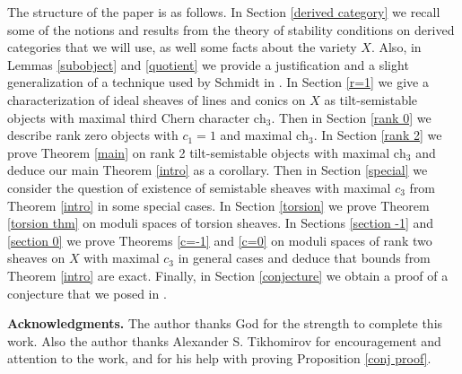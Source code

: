 \documentclass{amsart}
\begin{document}
	The structure of the paper is as follows. In Section \ref{derived category} we recall some of the notions and results from the theory of stability conditions on derived categories that we will use, as well some facts about the variety $X$. Also, in Lemmas \ref{subobject} and \ref{quotient} we provide a justification and a slight generalization of a technique used by Schmidt in \cite{Sch23}. In Section \ref{r=1} we give a characterization of ideal sheaves of lines and conics on $X$ as tilt-semistable objects with maximal third Chern character $\mathrm{ch}_3$. Then in Section \ref{rank 0} we describe rank zero objects with $c_1=1$ and maximal $\mathrm{ch}_3$. In Section \ref{rank 2} we prove Theorem \ref{main} on rank 2 tilt-semistable objects with maximal $\mathrm{ch}_3$ and deduce our main Theorem \ref{intro} as a corollary. Then in Section \ref{special} we consider the question of existence of semistable sheaves with maximal $c_3$ from Theorem \ref{intro} in some special cases. In Section \ref{torsion} we prove Theorem \ref{torsion thm} on moduli spaces of torsion sheaves. In Sections \ref{section -1} and \ref{section 0} we prove Theorems \ref{c=-1} and \ref{c=0} on moduli spaces of rank two sheaves on $X$ with maximal $c_3$ in general cases and deduce that bounds from Theorem \ref{intro} are exact. Finally, in Section \ref{conjecture} we obtain a proof of a conjecture that we posed in \cite{Vass}.
	
	\textbf{Acknowledgments.} The author thanks God for the strength to complete this work. Also the author thanks Alexander S. Tikhomirov for encouragement and attention to the work, and for his help with proving Proposition \ref{conj proof}.
	
\end{document}
